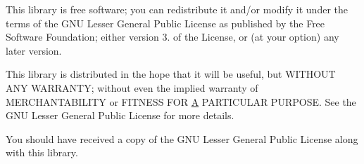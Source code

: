 This library is free software; you can redistribute it and/or modify it under the terms of the G\+N\+U Lesser General Public License as published by the Free Software Foundation; either version 3. of the License, or (at your option) any later version.

This library is distributed in the hope that it will be useful, but W\+I\+T\+H\+O\+U\+T A\+N\+Y W\+A\+R\+R\+A\+N\+T\+Y; without even the implied warranty of M\+E\+R\+C\+H\+A\+N\+T\+A\+B\+I\+L\+I\+T\+Y or F\+I\+T\+N\+E\+S\+S F\+O\+R \hyperlink{classA}{A} P\+A\+R\+T\+I\+C\+U\+L\+A\+R P\+U\+R\+P\+O\+S\+E. See the G\+N\+U Lesser General Public License for more details.

You should have received a copy of the G\+N\+U Lesser General Public License along with this library. 